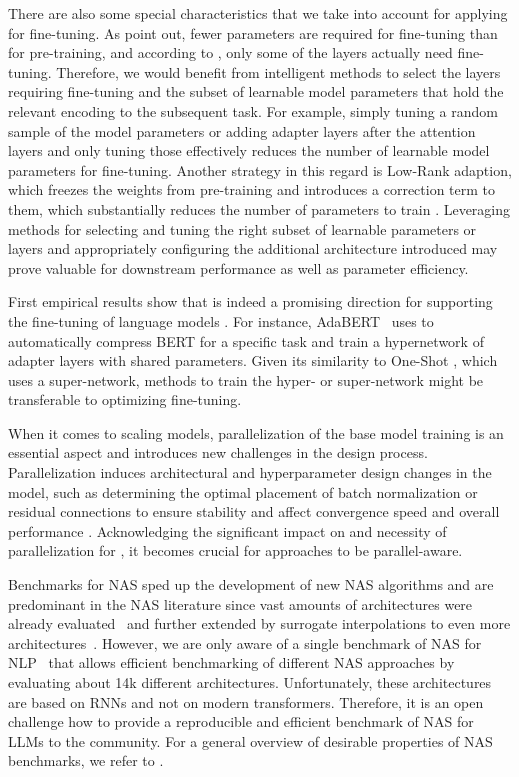 There are also some special characteristics that we take into account for applying \NAS for fine-tuning.
As \citet{aghajanyan-acl21} point out, fewer parameters are required for fine-tuning than for pre-training, and according to \citet{lee-arxiv19}, only some of the layers actually need fine-tuning.
Therefore, we would benefit from intelligent methods to select the layers requiring fine-tuning and the subset of learnable model parameters that hold the relevant encoding to the subsequent task. For example, simply tuning a random sample of the model parameters \cite{aghajanyan-acl21} or adding adapter layers after the attention layers and only tuning those \cite{houlsby-icml19} effectively reduces the number of learnable model parameters for fine-tuning. Another strategy in this regard is Low-Rank adaption, which freezes the weights from pre-training and introduces a correction term to them, which substantially reduces the number of parameters to train \cite{hu-iclr22a}.
Leveraging \AutoML methods for selecting and tuning the right subset of learnable parameters or layers and appropriately configuring the additional architecture introduced may prove valuable for downstream performance as well as parameter efficiency.

First empirical results show that \NAS is indeed a promising direction for supporting the fine-tuning of language models \cite{chitty-ieeea22a}.
For instance, AdaBERT~\cite{chen-ijcai20} uses \NAS to automatically compress BERT for a specific task and
\citet{mahabadi-acl21} train a hypernetwork of adapter layers with shared parameters. 
Given its similarity to One-Shot \NAS \cite{bender-icml18a,brock-iclr18a,shi-neurips20a}, which uses a super-network, methods to train the hyper- or super-network might be transferable to optimizing \LLM fine-tuning. 

When it comes to scaling models, parallelization of the base model training is an essential aspect and introduces new challenges in the design process.
Parallelization induces architectural and hyperparameter design changes in the model, such as determining the optimal placement of batch normalization or residual connections to ensure stability and affect convergence speed and overall performance \cite{shoeybi-arxiv2019a}. 
Acknowledging the significant impact on and necessity of parallelization for \LLMs, it becomes crucial for \NAS approaches to be parallel-aware.

Benchmarks for NAS sped up the development of new NAS algorithms and are predominant in the NAS literature since vast amounts of architectures were already evaluated~\cite{ying-icml19a,dong-iclr20a,mehta-iclr22a} and further extended by surrogate interpolations to even more architectures~\cite{zela-iclr22a}.
However, we are only aware of a single benchmark of NAS for NLP~\cite{klyuchnikov-tfas22a} that allows efficient benchmarking of different NAS approaches by evaluating about 14k different architectures. Unfortunately, these architectures are based on RNNs and not on modern transformers. Therefore, it is an open challenge how to provide a reproducible and efficient benchmark of NAS for LLMs to the community.
For a general overview of desirable properties of NAS benchmarks, we refer to \citet{lindauer-jmlr20a}.

